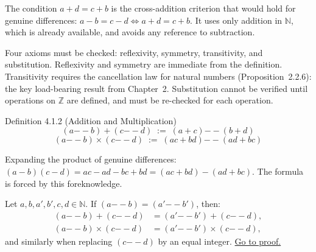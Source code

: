 \begin{remark*}
The condition $a + d = c + b$ is the cross-addition criterion that would
hold for genuine differences: $a - b = c - d \iff a + d = c + b$.
It uses only addition in $\mathbb{N}$, which is already available,
and avoids any reference to subtraction.
\end{remark*}

\begin{remark*}
Four axioms must be checked: reflexivity, symmetry, transitivity,
and substitution.
Reflexivity and symmetry are immediate from the definition.
Transitivity requires the cancellation law for natural numbers
(Proposition~2.2.6): the key load-bearing result from Chapter~2.
Substitution cannot be verified until operations on $\mathbb{Z}$ are
defined, and must be re-checked for each operation.
\end{remark*}

\begin{propositionbox}{Definition 4.1.2 (Addition and Multiplication)}
\[
(a {-\!\!-} b) + (c {-\!\!-} d) \;:=\; (a+c) {-\!\!-} (b+d)
\]
\[
(a {-\!\!-} b) \times (c {-\!\!-} d) \;:=\; (ac+bd) {-\!\!-} (ad+bc)
\]
\end{propositionbox}

\begin{remark*}
Expanding the product of genuine differences:
$(a-b)(c-d) = ac - ad - bc + bd = (ac+bd) - (ad+bc)$.
The formula is forced by this foreknowledge.
\end{remark*}

\begin{lemma}
\label{lem:int-well-defined}
Let $a, b, a', b', c, d \in \mathbb{N}$.
If $(a {-\!\!-} b) = (a' {-\!\!-} b')$, then:
\begin{align*}
(a {-\!\!-} b) + (c {-\!\!-} d) &= (a' {-\!\!-} b') + (c {-\!\!-} d), \\
(a {-\!\!-} b) \times (c {-\!\!-} d) &= (a' {-\!\!-} b') \times (c {-\!\!-} d),
\end{align*}
and similarly when replacing $(c {-\!\!-} d)$ by an equal integer.
\hyperref[prf:int-well-defined]{Go to proof.}
\end{lemma}

